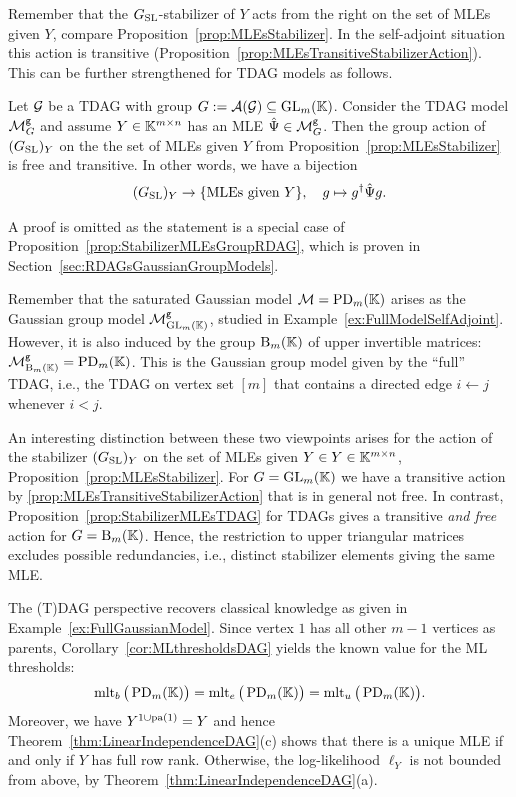 Remember that the $G_{\operatorname{SL}}$-stabilizer of $Y$ acts from the right on the set of MLEs given $Y$, compare Proposition~\ref{prop:MLEsStabilizer}. In the self-adjoint situation this action is transitive (Proposition~\ref{prop:MLEsTransitiveStabilizerAction}). This can be further strengthened for TDAG models as follows.

\begin{prop}\label{prop:StabilizerMLEsTDAG}
	Let $\mathcal{G}$ be a TDAG with group $G := \mathcal{A}(\mathcal{G}) \subseteq \operatorname{GL}_m(\mathbb K)$. Consider the TDAG model $\mathcal{M}^{\mathtt{g}}_G$ and assume $Y \in \mathbb K^{m \times n}$ has an MLE $\hat{\Psi} \in \mathcal{M}^{\mathtt{g}}_G$. Then the group action of $(G_{\operatorname{SL}})_Y$ on the the set of MLEs given $Y$ from Proposition~\ref{prop:MLEsStabilizer} is free and transitive. In other words, we have a bijection
	\begin{align*}
		(G_{\operatorname{SL}})_Y \to \{ \text{MLEs given } Y\} , \quad g \mapsto g^{\dagger} \hat{\Psi} g.
	\end{align*}
\end{prop}

A proof is omitted as the statement is a special case of Proposition~\ref{prop:StabilizerMLEsGroupRDAG}, which is proven in Section~\ref{sec:RDAGsGaussianGroupModels}.

\begin{example}\label{ex:FullModelAsTDAG}
	Remember that the saturated Gaussian model $\mathcal{M} = \operatorname{PD}_m(\mathbb K)$ arises as the Gaussian group model $\mathcal{M}^{\mathtt{g}}_{\operatorname{GL}_m(\mathbb K)}$, studied in Example~\ref{ex:FullModelSelfAdjoint}. However, it is also induced by the group $\operatorname{B}_m(\mathbb K)$ of upper invertible matrices: $\mathcal{M}^{\mathtt{g}}_{\operatorname{B}_m(\mathbb K)} = \operatorname{PD}_m(\mathbb K)$. This is the Gaussian group model given by the ``full'' TDAG, i.e., the TDAG on vertex set $[m]$ that contains a directed edge $i \leftarrow j$ whenever $i < j$.
	
	An interesting distinction between these two viewpoints arises for the action of the stabilizer $(G_{\operatorname{SL}})_Y$ on the set of MLEs given $Y \in Y \in \mathbb K^{m \times n}$, Proposition~\ref{prop:MLEsStabilizer}. For $G = \operatorname{GL}_m(\mathbb K)$ we have a transitive action by \ref{prop:MLEsTransitiveStabilizerAction} that is in general not free. In contrast, Proposition~\ref{prop:StabilizerMLEsTDAG} for TDAGs gives a transitive \emph{and free} action for $G = \operatorname{B}_m(\mathbb K)$. Hence, the restriction to upper triangular matrices excludes possible redundancies, i.e., distinct stabilizer elements giving the same MLE.
	
	The (T)DAG perspective recovers classical knowledge as given in Example~\ref{ex:FullGaussianModel}.
	Since vertex $1$ has all other $m-1$ vertices as parents, Corollary~\ref{cor:MLthresholdsDAG} yields the known value for the ML thresholds:
		\[ \operatorname{mlt}_b \big( \operatorname{PD}_m(\mathbb K) \big) = \operatorname{mlt}_e \big( \operatorname{PD}_m(\mathbb K) \big) = \operatorname{mlt}_u \big( \operatorname{PD}_m(\mathbb K) \big) . \]
	Moreover, we have $Y^{1 \cup \operatorname{pa}(1)} = Y$ and hence Theorem~\ref{thm:LinearIndependenceDAG}(c) shows that there is a unique MLE if and only if $Y$ has full row rank. Otherwise, the log-likelihood $\ell_Y$ is not bounded from above, by Theorem~\ref{thm:LinearIndependenceDAG}(a).
	\hfill\exSymbol
\end{example}

